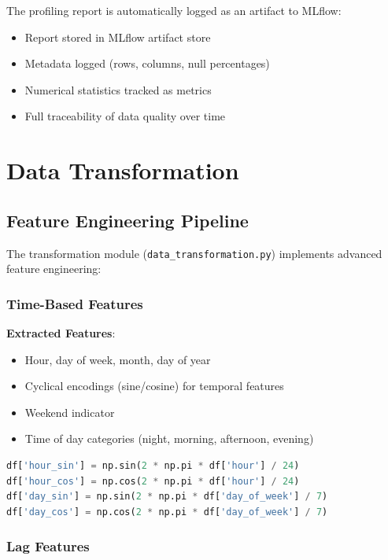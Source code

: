 \documentclass[12pt,a4paper]{article}
\begin{document}
The profiling report is automatically logged as an artifact to MLflow:

\begin{itemize}
    \item Report stored in MLflow artifact store
    \item Metadata logged (rows, columns, null percentages)
    \item Numerical statistics tracked as metrics
    \item Full traceability of data quality over time
\end{itemize}

\section{Data Transformation}

\subsection{Feature Engineering Pipeline}

The transformation module (\texttt{data\_transformation.py}) implements advanced feature engineering:

\subsubsection{Time-Based Features}

\textbf{Extracted Features}:
\begin{itemize}
    \item Hour, day of week, month, day of year
    \item Cyclical encodings (sine/cosine) for temporal features
    \item Weekend indicator
    \item Time of day categories (night, morning, afternoon, evening)
\end{itemize}

\begin{lstlisting}[language=Python, caption=Cyclical Time Features]
df['hour_sin'] = np.sin(2 * np.pi * df['hour'] / 24)
df['hour_cos'] = np.cos(2 * np.pi * df['hour'] / 24)
df['day_sin'] = np.sin(2 * np.pi * df['day_of_week'] / 7)
df['day_cos'] = np.cos(2 * np.pi * df['day_of_week'] / 7)
\end{lstlisting}

\subsubsection{Lag Features}
\end{document}
